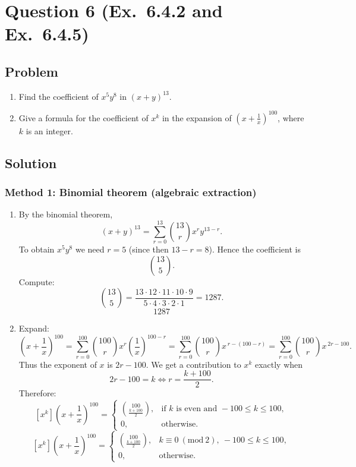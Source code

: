 \documentclass[12pt]{article}
\begin{document}
\section{Question 6 (Ex.\ 6.4.2 and Ex.\ 6.4.5)}
\subsection{Problem}
\begin{enumerate}[label=(\alph*)]
\item Find the coefficient of $x^{5}y^{8}$ in $(x+y)^{13}$.
\item Give a formula for the coefficient of $x^{k}$ in the expansion of $\left(x+\frac{1}{x}\right)^{100}$, where $k$ is an integer.
\end{enumerate}

\subsection{Solution}

\subsubsection{Method 1: Binomial theorem (algebraic extraction)}
\begin{enumerate}[label=(\alph*)]
\item By the binomial theorem,
\[
(x+y)^{13}=\sum_{r=0}^{13}\binom{13}{r}x^{r}y^{13-r}.
\]
To obtain $x^{5}y^{8}$ we need $r=5$ (since then $13-r=8$). Hence the coefficient is
\[
\binom{13}{5}.
\]
Compute:
\[
\binom{13}{5}=\frac{13\cdot 12\cdot 11\cdot 10\cdot 9}{5\cdot 4\cdot 3\cdot 2\cdot 1}=1287.
\]
\[
\boxed{1287}
\]

\item Expand:
\[
\left(x+\frac{1}{x}\right)^{100}
=\sum_{r=0}^{100}\binom{100}{r}x^{r}\left(\frac{1}{x}\right)^{100-r}
=\sum_{r=0}^{100}\binom{100}{r}x^{\,r-(100-r)}
=\sum_{r=0}^{100}\binom{100}{r}x^{\,2r-100}.
\]
Thus the exponent of $x$ is $2r-100$. We get a contribution to $x^k$ exactly when
\[
2r-100=k \iff r=\frac{k+100}{2}.
\]
Therefore:
\[
[x^k]\left(x+\frac{1}{x}\right)^{100}
=
\begin{cases}
\displaystyle \binom{100}{\frac{k+100}{2}}, & \text{if }k\text{ is even and }-100\le k\le 100,\\[1.0em]
0, & \text{otherwise.}
\end{cases}
\]
\[
\boxed{
[x^k]\left(x+\frac{1}{x}\right)^{100}
=
\begin{cases}
\displaystyle \binom{100}{\frac{k+100}{2}}, & k\equiv 0\ (\mathrm{mod}\ 2),\ -100\le k\le 100,\\
0, & \text{otherwise.}
\end{cases}}
\]
\end{enumerate}
\end{document}
